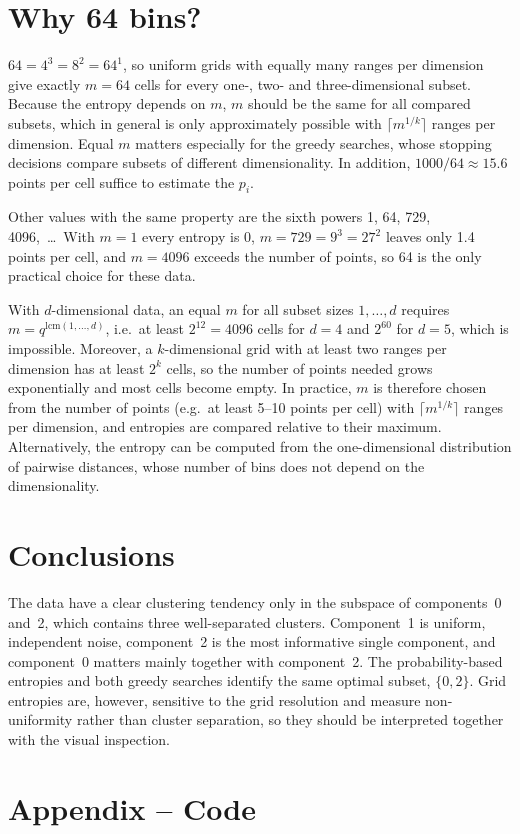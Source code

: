 \documentclass[a4paper,12pt]{article}
\begin{document}
\section{Why 64 bins?}

$64=4^3=8^2=64^1$, so uniform grids with equally many ranges per dimension
give exactly $m=64$ cells for every one-, two- and three-dimensional
subset. Because the entropy depends on $m$, $m$ should be the same for all
compared subsets, which in general is only approximately possible with
$\lceil m^{1/k}\rceil$ ranges per dimension. Equal $m$ matters especially
for the greedy searches, whose stopping decisions compare subsets of
different dimensionality. In addition, $1000/64\approx15.6$ points per cell
suffice to estimate the $p_i$.

Other values with the same property are the sixth powers 1, 64, 729,
4096,~\dots\ With $m=1$ every entropy is 0, $m=729=9^3=27^2$ leaves only
1.4 points per cell, and $m=4096$ exceeds the number of points, so 64 is
the only practical choice for these data.

With $d$-dimensional data, an equal $m$ for all subset sizes $1,\dots,d$
requires $m=q^{\mathrm{lcm}(1,\dots,d)}$, i.e.\ at least $2^{12}=4096$
cells for $d=4$ and $2^{60}$ for $d=5$, which is impossible. Moreover, a
$k$-dimensional grid with at least two ranges per dimension has at least
$2^k$ cells, so the number of points needed grows exponentially and most
cells become empty. In practice, $m$ is therefore chosen from the number of
points (e.g.\ at least 5--10 points per cell) with $\lceil m^{1/k}\rceil$
ranges per dimension, and entropies are compared relative to their
maximum. Alternatively, the entropy can be computed from the
one-dimensional distribution of pairwise distances, whose number of bins
does not depend on the dimensionality.

\section{Conclusions}

The data have a clear clustering tendency only in the subspace of
components~0 and~2, which contains three well-separated clusters.
Component~1 is uniform, independent noise, component~2 is the most
informative single component, and component~0 matters mainly together with
component~2. The probability-based entropies and both greedy searches
identify the same optimal subset, $\{0,2\}$. Grid entropies are, however,
sensitive to the grid resolution and measure non-uniformity rather than
cluster separation, so they should be interpreted together with the visual
inspection.

\section{Appendix -- Code}


\end{document}
